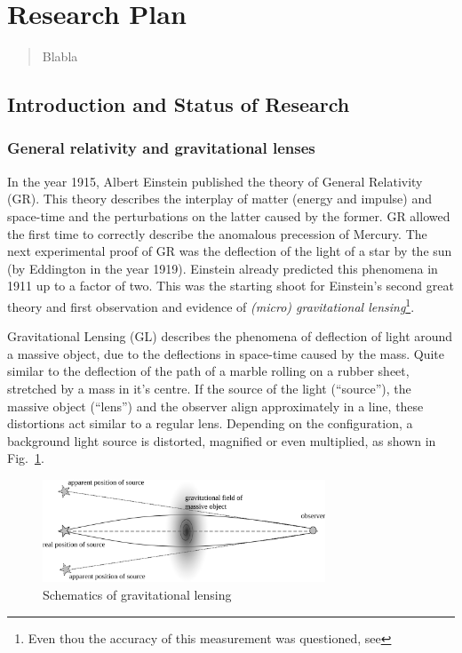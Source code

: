 \documentclass[11pt]{article}
\begin{document}
\newpage

\section*{Research Plan}

\begin{abstract}
Blabla
\end{abstract}


\subsection{Introduction and Status of Research}

\subsubsection{General relativity and gravitational lenses}

In the year 1915, Albert Einstein published the theory of General Relativity (GR).
This theory describes the interplay of matter (energy and impulse) and space-time and the perturbations on the latter caused by the former.
GR allowed the first time to correctly describe the anomalous precession of Mercury.
The next experimental proof of GR was the deflection of the light of a star by the sun (by Eddington in the year 1919).
Einstein already predicted this phenomena in 1911 up to a factor of two.
This was the starting shoot for Einstein’s second great theory and first observation and evidence of \emph{(micro) gravitational lensing}\footnote{Even thou the accuracy of this measurement was questioned, see\cite{kennefick2009testing}}.

Gravitational Lensing (GL) describes the phenomena of deflection of light around a massive object, due to the deflections in space-time caused by the mass.
Quite similar to the deflection of the path of a marble rolling on a rubber sheet, stretched by a mass in it's centre.
If the source of the light (``source''), the massive object (``lens'') and the observer align approximately in a line, these distortions act similar to a regular lens.
Depending on the configuration, a background light source is distorted, magnified or even multiplied, as shown in Fig.~\ref{fig:grav_lens}.

\begin{figure}[h]
	\centering
		\includegraphics[width=0.75\textwidth]{img/grav_lens}
	\caption{Schematics of gravitational lensing}
	\label{fig:grav_lens}
\end{figure}
\end{document}

